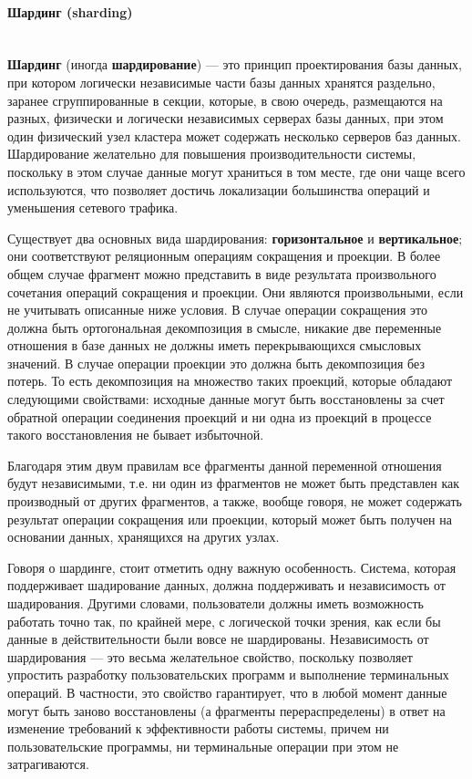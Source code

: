 \paragraph{Шардинг (sharding)} ~\\
\textbf{Шардинг} (иногда \textbf{шардирование}) — это принцип проектирования базы данных, при котором логически
независимые части базы данных хранятся раздельно, заранее сгруппированные в секции, которые, в свою очередь, размещаются
на разных, физически и логически независимых серверах базы данных, при этом один физический узел кластера может
содержать несколько серверов баз данных. Шардирование желательно для повышения производительности системы, поскольку
в этом случае данные могут храниться в том месте, где они чаще всего используются, что позволяет достичь локализации
большинства операций и уменьшения сетевого трафика.

Существует два основных вида шардирования: \textbf{горизонтальное} и \textbf{вертикальное}; они соответствуют
реляционным операциям сокращения и проекции. В более общем случае фрагмент можно представить в виде результата
произвольного сочетания операций сокращения и проекции. Они являются произвольными, если не учитывать описанные ниже
условия. В случае операции сокращения это должна быть ортогональная декомпозиция в смысле, никакие две переменные
отношения в базе данных не должны иметь перекрывающихся смысловых значений. В случае операции проекции это должна быть
декомпозиция без потерь. То есть декомпозиция на множество таких проекций, которые обладают следующими свойствами:
исходные данные могут быть восстановлены за счет обратной операции соединения проекций и ни одна из проекций в процессе
такого восстановления не бывает избыточной.

Благодаря этим двум правилам все фрагменты данной переменной отношения будут независимыми, т.е. ни один из фрагментов
не может быть представлен как производный от других фрагментов, а также, вообще говоря, не может содержать результат
операции сокращения или проекции, который может быть получен на основании данных, хранящихся на других узлах.

Говоря о шардинге, стоит отметить одну важную особенность. Система, которая поддерживает шадирование данных, должна
поддерживать и независимость от шадирования. Другими словами, пользователи должны иметь возможность работать точно так,
по крайней мере, с логической точки зрения, как если бы данные в действительности были вовсе не шардированы.
Независимость от шардирования — это весьма желательное свойство, поскольку позволяет упростить разработку
пользовательских программ и выполнение терминальных операций. В частности, это свойство гарантирует, что в любой момент
данные могут быть заново восстановлены (а фрагменты перераспределены) в ответ на изменение требований к эффективности
работы системы, причем ни пользовательские программы, ни терминальные операции при этом не затрагиваются.

